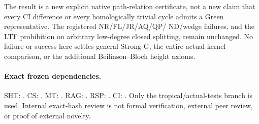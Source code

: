 The result is a new explicit native path-relation certificate, not a
new claim that every CI difference or every homologically trivial
cycle admits a Green representative.  The registered NR/FL/JR/AQ/QP/
ND/wedge failures, and the LTF prohibition on arbitrary low-degree
closed splitting, remain unchanged.  No failure or success here
settles general Strong G, the entire actual kernel comparison, or
the additional Beilinson--Bloch height axioms.

\paragraph{Exact frozen dependencies.}
SHT: .
CS: .
MT: .
RAG: .
RSP: .
CI: .
Only the tropical/actual-tests branch is used.  Internal exact-hash
review is not formal verification, external peer review, or proof
of external novelty.
